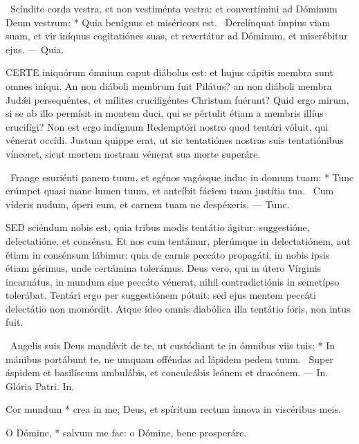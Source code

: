\R\ Scíndite corda vestra, et non vestiménta vestra: et convertímini ad Dóminum Deum vestrum: * Quia benígnus et miséricors est. \V\ Derelínquat ímpius viam suam, et vir iníquus cogitatiónes suas, et revertátur ad Dóminum, et miserébitur ejus. --- Quia.


\lettrine[lines=2]{C}{ERTE} iniquórum ómnium caput diábolus est: et hujus cápitis membra sunt omnes iníqui. An non diáboli membrum fuit Pilátus? an non diáboli membra Judǽi persequéntes, et mílites crucifigéntes Christum fuérunt? Quid ergo mirum, si se ab illo permísit in montem duci, qui se pértulit étiam a membris illíus crucifígi? Non est ergo indígnum Redemptóri nostro quod tentári vóluit, qui vénerat occídi. Justum quippe erat, ut sic tentatiónes nostras suis tentatiónibus vínceret, sicut mortem nostram vénerat sua morte superáre.

\R\ Frange esuriénti panem tuum, et egénos vagósque induc in domum tuam: * Tunc erúmpet quasi mane lumen tuum, et anteíbit fáciem tuam justítia tua. \V\ Cum víderis nudum, óperi eum, et carnem tuam ne despéxeris. --- Tunc.


\lettrine[lines=2]{S}{ED} sciéndum nobis est, quia tribus modis tentátio ágitur: suggestióne, delectatióne, et consénsu. Et nos cum tentámur, plerúmque in delectatiónem, aut étiam in consénsum lábimur: quia de carnis peccáto propagáti, in nobis ipsis étiam gérimus, unde certámina tolerámus. Deus vero, qui in útero Vírginis incarnátus, in mundum sine peccáto vénerat, nihil contradictiónis in semetípso tolerábat. Tentári ergo per suggestiónem pótuit: sed ejus mentem peccáti delectátio non momórdit. Atque ídeo omnis diabólica illa tentátio foris, non intus fuit.

\R\ Angelis suis Deus mandávit de te, ut custódiant te in ómnibus viis tuis: * In mánibus portábunt te, ne umquam offéndas ad lápidem pedem tuum. \V\ Super áspidem et basilíscum ambulábis, et conculcábis leónem et dracónem. --- In. Glória Patri. In.



 Cor mundum * crea in me, Deus, et spíritum rectum ínnova in viscéribus meis.


 O Dómine, * salvum me fac: o Dómine, bene prosperáre.

